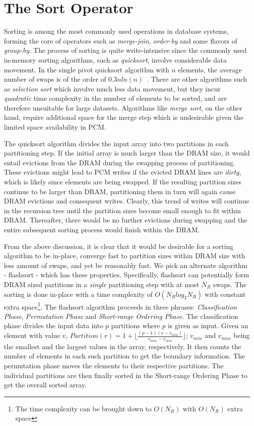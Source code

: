 \section{The Sort Operator}
\label{sort}

Sorting is among the most commonly used operations in database systems,
forming the core of operators such as \emph{merge-join}, \emph{order-by} and
some flavors of \emph{group-by}.  The process of sorting is quite
write-intensive since the commonly used in-memory sorting algorithms,
such as \textit{quicksort}, involve considerable data movement. In the
single pivot quicksort algorithm with $n$ elements, the average number
of swaps is of the order of $0.3nln(n)$~\cite{swaps}.  There are other
algorithms such as \emph{selection sort} which involve much less data
movement, but they incur \emph{quadratic} time complexity in the number
of elements to be sorted, and are therefore unsuitable for large datasets. Algorithms like \emph {merge sort}, on the other hand, require additional space for the merge step which is undesirable given the limited space availability in PCM.

The quicksort algorithm divides the input array into two partitions in each partitioning step. If the initial array is much larger than the DRAM size, it would
entail evictions from the DRAM during the swapping process of
partitioning. These evictions might lead to PCM writes if the evicted
DRAM lines are \textit{dirty}, which is likely since elements are being
swapped. If the resulting partition sizes continue to be larger than
DRAM, partitioning them in turn will again cause DRAM evictions and
consequent writes. Clearly, this trend of writes will continue in the
recursion tree until the partition sizes become small enough to fit within
DRAM. Thereafter, there would be no further evictions during swapping
and the entire subsequent sorting process would finish within the DRAM.

From the above discussion, it is clear that it would be desirable for a sorting algorithm to be in-place, converge fast to partition sizes within DRAM size with less amount of swaps, and yet be reasonably fast. We pick an alternate algorithm - flashsort \cite{flashsort} - which has these properties. Specifically, flashsort can potentially form DRAM sized partitions in a \emph{single} partitioning step with at most $N_R$ swaps. The sorting is done in-place with a time complexity of $O(N_Rlog_2N_R)$ with constant extra space\footnote{The time complexity can be brought down to $O(N_R)$ with $O(N_R)$ extra space}. The flashsort algorithm proceeds in three phrases: \emph{Classification Phase}, \emph{Permutation Phase} and \emph{Short-range Ordering Phase}. The classification phase divides the input data into $p$ partitions where $p$ is given as input. Given an element with value $v$, $Partition(v) = 1 + \lfloor \frac{(p-1)(v- v_{min})}{v_{max}-v_{min}} \rfloor$; $v_{min}$ and $v_{max}$ being the smallest and the largest values in the array, respectively. It then counts the number of elements in each such partition to get the boundary information. The permutation phase moves the elements to their respective partitions. The individual partitions are then finally sorted in the Short-range Ordering Phase to get the overall sorted array.


